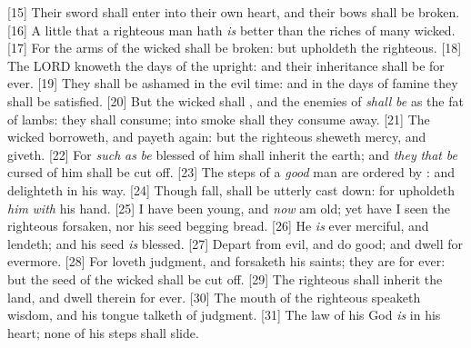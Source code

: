 [15] \textcolor[cmyk]{0.99998,1,0,0}{Their sword shall enter into their own heart, and their bows shall be broken.}
[16] \textcolor[cmyk]{0.99998,1,0,0}{A little that a righteous man hath \emph{is} better than the riches of many wicked.}
[17] \textcolor[cmyk]{0.99998,1,0,0}{For the arms of the wicked shall be broken: but  upholdeth the righteous.}
[18] \textcolor[cmyk]{0.99998,1,0,0}{The LORD knoweth the days of the upright: and their inheritance shall be for ever.}
[19] \textcolor[cmyk]{0.99998,1,0,0}{They shall  be ashamed in the evil time: and in the days of famine they shall be satisfied.}
[20] \textcolor[cmyk]{0.99998,1,0,0}{But the wicked shall , and the enemies of  \emph{shall} \emph{be} as the fat of lambs: they shall consume; into smoke shall they consume away.}
[21] \textcolor[cmyk]{0.99998,1,0,0}{The wicked borroweth, and payeth  again: but the righteous sheweth mercy, and giveth.}
[22] \textcolor[cmyk]{0.99998,1,0,0}{For \emph{such} \emph{as} \emph{be} blessed of him shall inherit the earth; and \emph{they} \emph{that} \emph{be} cursed of him shall be cut off.}
[23] \textcolor[cmyk]{0.99998,1,0,0}{The steps of a \emph{good} man are ordered by : and  delighteth in his way.}
[24] \textcolor[cmyk]{0.99998,1,0,0}{Though  fall,  shall  be utterly cast down: for  upholdeth \emph{him} \emph{with} his hand.}
[25] \textcolor[cmyk]{0.99998,1,0,0}{I have been young, and \emph{now} am old; yet have I  seen the righteous forsaken, nor his seed begging bread.}
[26] \textcolor[cmyk]{0.99998,1,0,0}{He \emph{is} ever merciful, and lendeth; and his seed \emph{is} blessed.}
[27] \textcolor[cmyk]{0.99998,1,0,0}{Depart from evil, and do good; and dwell for evermore.}
[28] \textcolor[cmyk]{0.99998,1,0,0}{For  loveth judgment, and forsaketh  his saints; they are  for ever: but the seed of the wicked shall be cut off.}
[29] \textcolor[cmyk]{0.99998,1,0,0}{The righteous shall inherit the land, and dwell therein for ever.}
[30] \textcolor[cmyk]{0.99998,1,0,0}{The mouth of the righteous speaketh wisdom, and his tongue talketh of judgment.}
[31] \textcolor[cmyk]{0.99998,1,0,0}{The law of his God \emph{is} in his heart; none of his steps shall slide.}
